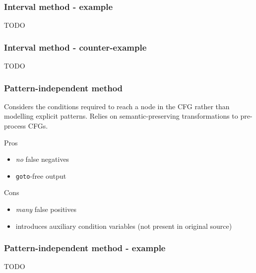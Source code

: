 \documentclass[aspectratio=1610]{beamer}
\begin{document}
\begin{frame}
	\frametitle{Interval method - example}

	TODO
\end{frame}

\begin{frame}
	\frametitle{Interval method - counter-example}

	TODO
\end{frame}


\begin{frame}
	\frametitle{Pattern-independent method}

	Considers the conditions required to reach a node in the CFG rather than modelling explicit patterns. Relies on semantic-preserving transformations to pre-process CFGs.

	\vspace*{2em}

	\begin{block}{Pros}
		\begin{itemize}
			\item \textit{no} false negatives
			\item \texttt{goto}-free output
		\end{itemize}
	\end{block}

	\begin{block}{Cons}
		\begin{itemize}
			\item \textit{many} false positives
			\item introduces auxiliary condition variables (not present in original source)
		\end{itemize}
	\end{block}




\end{frame}

\begin{frame}
	\frametitle{Pattern-independent method - example}

	TODO
\end{frame}
\end{document}
